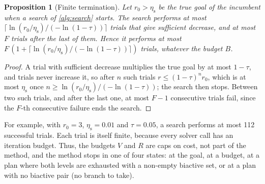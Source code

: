 \documentclass[11pt]{article}
\newtheorem{proposition}{Proposition}
\theoremstyle{remark}
\newcommand{\etas}{\eta_{\mathrm{s}}}
\begin{document}
\begin{proposition}[Finite termination]
\label{prop:finite}
Let $r_0 > \etas$ be the true goal of the incumbent when a search of \cref{alg:search} starts. The search performs at most $\lceil \ln(r_0/\etas) / (-\ln(1-\tau)) \rceil$ trials that give sufficient decrease, and at most $F$ trials after the last of them. Hence it performs at most $F\,(1 + \lceil \ln(r_0/\etas)/(-\ln(1-\tau)) \rceil)$ trials, whatever the budget $B$.
\end{proposition}
\begin{proof}
A trial with sufficient decrease multiplies the true goal by at most $1-\tau$, and trials never increase it, so after $n$ such trials $r \leq (1-\tau)^n r_0$, which is at most $\etas$ once $n \geq \ln(r_0/\etas)/(-\ln(1-\tau))$; the search then stops. Between two such trials, and after the last one, at most $F - 1$ consecutive trials fail, since the $F$-th consecutive failure ends the search.
\end{proof}
For example, with $r_0 = 3$, $\etas = 0.01$ and $\tau = 0.05$, a search performs at most 112 successful trials. Each trial is itself finite, because every solver call has an iteration budget. Thus, the budgets $V$ and $R$ are caps on cost, not part of the method, and the method stops in one of four states: at the goal, at a budget, at a plan where both levels are exhausted with a non-empty biactive set, or at a plan with no biactive pair (no branch to take).
\end{document}
